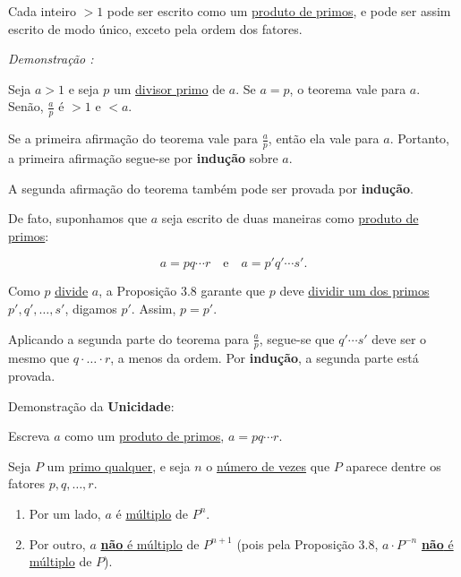         \begin{teorema}
            Cada inteiro $> 1$ pode ser escrito como um \underline{produto de primos}, e pode ser assim escrito de modo único, exceto pela ordem dos fatores.
        \end{teorema}
        
        \noindent\textit{Demonstração : }

        Seja $a > 1$ e seja $p$ um \underline{divisor primo} de $a$. Se $a = p$, o teorema vale para $a$. Senão, 
        $\frac{a}{p}$ é $> 1$ e $< a$. 

        Se a primeira afirmação do teorema vale para $\frac{a}{p}$, então ela vale para $a$. Portanto, a primeira afirmação segue-se por \textbf{indução} sobre $a$.  

        A segunda afirmação do teorema também pode ser provada por \textbf{indução}. 

        De fato, suponhamos que $a$ seja escrito de duas maneiras como \underline{produto de primos}:  

        \[
        a = pq\cdots r \quad \text{e} \quad a = p' q' \cdots s'.
        \]  

        Como $p$ \underline{divide} $a$, a Proposição 3.8 garante que $p$ deve \underline{dividir um dos primos} $p', q', \ldots, s'$, 
        digamos $p'$. Assim, $p = p'$.  

        Aplicando a segunda parte do teorema para $\frac{a}{p}$, segue-se que $q'\cdots s'$ deve ser o mesmo 
        que $q \cdot \ldots \cdot r$, a menos da ordem. Por \textbf{indução}, a segunda parte está provada.  

        Demonstração da \textbf{Unicidade}: 

        Escreva $a$ como um \underline{produto de primos}, $a = pq \cdots r$.  

        Seja $P$ um \underline{primo qualquer}, e seja $n$ o \underline{número de vezes} que $P$ aparece dentre os fatores $p,q,\ldots,r$.  

        \begin{enumerate}[left=0.5cm, align=left, nosep]
            \item Por um lado, $a$ é \underline{múltiplo} de $P^n$.
            \item Por outro, $a$ \underline{\textbf{não} é múltiplo} de $P^{n+1}$ (pois pela Proposição 3.8, $a \cdot P^{-n}$ \underline{\textbf{não} é múltiplo} de $P$).      
        \end{enumerate}

